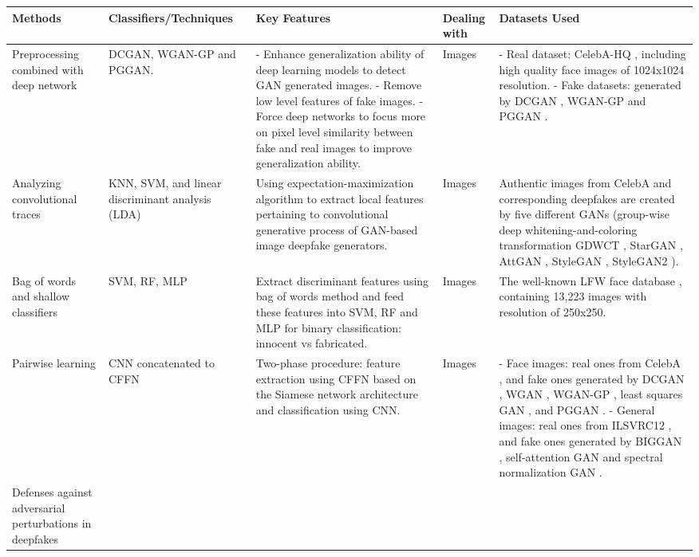 \begin{table}[h!]
\centering
\begin{scriptsize}
\begin{tabularx}{\linewidth}{p{} p{} p{} p{} p{}}
\toprule
\textbf{Methods} & \textbf{Classifiers/\newline Techniques} & \textbf{Key Features} & \textbf{Dealing with} & \textbf{Datasets Used}\\
\midrule
Preprocessing combined with deep network 
&DCGAN,
WGAN-GP and PGGAN.
&- Enhance generalization ability of deep learning models to detect GAN generated images.\newline
- Remove low level features of fake images.\newline
- Force deep networks to focus more on pixel level similarity between fake and real images to improve generalization ability.
&Images
&- Real dataset: CelebA-HQ , including high quality face images of 1024x1024 resolution.\newline
- Fake datasets: generated by DCGAN , WGAN-GP  and PGGAN .\\
\hline
Analyzing convolutional traces 
& KNN, SVM, and linear discriminant analysis (LDA)
& Using expectation-maximization algorithm to extract local features pertaining to convolutional generative process of GAN-based image deepfake generators.
& Images
& Authentic images from CelebA and corresponding deepfakes are created by five different GANs (group-wise deep whitening-and-coloring transformation GDWCT , StarGAN ,
AttGAN , StyleGAN , StyleGAN2 ).\\
\hline
Bag of words and shallow classifiers 	
&SVM, RF, MLP
&Extract discriminant features using bag of words method and feed these features into SVM, RF and MLP for binary classification: innocent vs fabricated.
&Images
&The well-known LFW face database , containing 13,223 images with resolution of 250x250.\\
\hline
Pairwise learning 
&CNN concatenated to CFFN
&Two-phase procedure: feature extraction using CFFN based on the Siamese network architecture  and classification using CNN.
&Images
&- Face images: real ones from CelebA , and fake ones generated by DCGAN , WGAN , WGAN-GP , least squares GAN , and PGGAN .\newline
- General images: real ones from ILSVRC12 , and fake ones generated by BIGGAN , self-attention GAN  and spectral normalization GAN .\\
\hline
Defenses against adversarial perturbations in deepfakes 

\end{tabularx}
\end{scriptsize}
\end{table}
